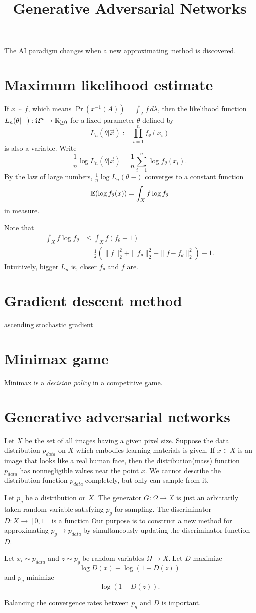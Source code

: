 \documentclass{../exp}
\title{Generative Adversarial Networks}
\begin{document}
\maketitle

The AI paradigm changes when a new approximating method is discovered.

\section{Maximum likelihood estimate}
If $x\sim f$, which means $\Pr(x^{-1}(A))=\int_Af\,d\lambda$, then the likelihood function $L_n(\theta|-):\Omega^n\to\R_{\ge0}$ for a fixed parameter $\theta$ defined by
\[L_n(\theta|\vec x):=\prod_{i=1}^nf_\theta(x_i)\]
is also a variable.
Write
\[\frac1n\log L_n(\theta|\vec x)=\frac1n\sum_{i=1}^n\log f_\theta(x_i).\]
By the law of large numbers, $\frac1n\log L_n(\theta|-)$ converges to a constant function
\[\mathbb{E}(\log f_\theta(x))=\int_Xf\log f_\theta\]
in measure.

Note that
\begin{align*}
\int_Xf\log f_\theta&\le\int_Xf(f_\theta-1)\\
&=\frac12(\|f\|_2^2+\|f_\theta\|_2^2-\|f-f_\theta\|_2^2)-1.
\end{align*}
Intuitively, bigger $L_n$ is, closer $f_\theta$ and $f$ are.


\section{Gradient descent method}
ascending stochastic gradient


\section{Minimax game}

Minimax is a \emph{decision policy} in a competitive game.

\section{Generative adversarial networks}
Let $X$ be the set of all images having a given pixel size.
Suppose the data distribution $p_{data}$ on $X$ which embodies learning materials is given.
If $x\in X$ is an image that looks like a real human face, then the distribution(mass) function $p_{data}$ has nonnegligible values near the point $x$.
We cannot describe the distribution function $p_{data}$ completely, but only can sample from it.

Let $p_g$ be a distribution on $X$.
The generator $G:\Omega\to X$ is just an arbitrarily taken random variable satisfying $p_g$ for sampling.
The discriminator $D:X\to[0,1]$ is a function
Our purpose is to construct a new method for approximating $p_g\to p_{data}$ by simultaneously updating the discriminator function $D$.

Let $x_i\sim p_{data}$ and $z\sim p_g$ be random variables $\Omega\to X$.
Let $D$ maximize
\[\log D(x)+\log(1-D(z))\]
and $p_g$ minimize
\[\log(1-D(z)).\]


Balancing the convergence rates between $p_g$ and $D$ is important.
\end{document}
